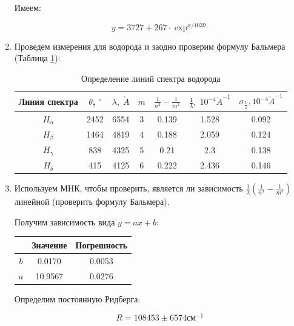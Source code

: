 \documentclass[a4paper, 12pt]{article}%
\begin{document}
\begin{enumerate}
Имеем:

\[y = 3727 + 267 \cdot \exp^{x / 1039}\]

\item Проведем измерения для водорода и заодно проверим формулу Бальмера (Таблица \ref{table_mn}):

\begin{table}[h!]
		\caption{Определение линий спектра водорода}
		\begin{center}
			\begin{tabular}{|c|c|c|c|c|c|c|}
				\hline 
				Линия спектра & $ \theta $, $ ^\circ $ & $ \lambda, \;\mathring{A} $ & $ m $ & $ \frac{1}{n^2} - \frac{1}{m^2} $ & $ \frac{1}{\lambda}, \;  10^{-4} \mathring{A}^{-1} $  &  $ \sigma_{\frac{1}{\lambda}}, 10^{-4} \mathring{A}^{-1} $ \\ 
				\hline 
			$ H_\alpha $ & 2452 & 6554 & 3 & 0.139 & 1.528 & 0.092 \\
			\hline
		$ H_\beta $  & 1464 & 4819 & 4 & 0.188 & 2.059 & 0.124 \\
		\hline
			$ H_\gamma $ & 838 & 4325 & 5 & 0.21 & 2.3 & 0.138 \\
			\hline
			$ H_\delta $ & 415 & 4125 & 6 & 0.222 & 2.436 & 0.146 \\
				\hline 
			\end{tabular} 
		\end{center}
		\label{table_mn}
	\end{table}

\item Используем МНК, чтобы проверить, является ли зависимость $\frac{1}{\lambda}(\frac{1}{n^2} - \frac{1}{m^2})$ линейной (проверить формулу Бальмера).

Получим зависимость вида $y = ax + b$:

	\begin{table}[H]
		\begin{center}
			\begin{tabular}{|c|c|c|}
				\hline
				& Значение & Погрешность \\
				\hline
				 $ b $ & 0.0170 & 0.0053 \\
				 \hline
				$ a $& 10.9567 & 0.0276 \\
				\hline 
			\end{tabular} 
		\end{center}
	\end{table}
	
Определим постоянную Ридберга:

\[
R = 108453 \pm 6574 \text{см}^{-1}
\]


\end{enumerate}
\end{document}
